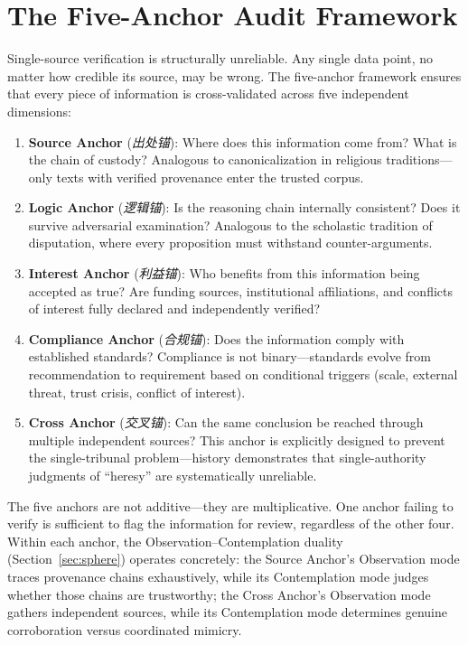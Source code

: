 \documentclass[11pt]{article}
\begin{document}
\section{The Five-Anchor Audit Framework}
\label{sec:five-anchor}

Single-source verification is structurally unreliable. Any single data point, no 
matter how credible its source, may be wrong. The five-anchor framework ensures 
that every piece of information is cross-validated across five independent dimensions:

\begin{enumerate}
  \item \textbf{Source Anchor} (\textit{出处锚}): Where does this information come from? 
    What is the chain of custody? Analogous to canonicalization in religious traditions---only 
    texts with verified provenance enter the trusted corpus.
  
  \item \textbf{Logic Anchor} (\textit{逻辑锚}): Is the reasoning chain internally consistent? 
    Does it survive adversarial examination? Analogous to the scholastic tradition of 
    disputation, where every proposition must withstand counter-arguments.
  
  \item \textbf{Interest Anchor} (\textit{利益锚}): Who benefits from this information being 
    accepted as true? Are funding sources, institutional affiliations, and conflicts of 
    interest fully declared and independently verified?
  
  \item \textbf{Compliance Anchor} (\textit{合规锚}): Does the information comply with 
    established standards? Compliance is not binary---standards evolve from recommendation 
    to requirement based on conditional triggers (scale, external threat, trust crisis, 
    conflict of interest).
  
  \item \textbf{Cross Anchor} (\textit{交叉锚}): Can the same conclusion be reached through 
    multiple independent sources? This anchor is explicitly designed to prevent the 
    single-tribunal problem---history demonstrates that single-authority judgments of 
    ``heresy'' are systematically unreliable.
\end{enumerate}

The five anchors are not additive---they are multiplicative. One anchor failing to 
verify is sufficient to flag the information for review, regardless of the other four.
Within each anchor, the Observation--Contemplation duality (Section~\ref{sec:sphere})
operates concretely: the Source Anchor's Observation mode traces provenance chains
exhaustively, while its Contemplation mode judges whether those chains are trustworthy;
the Cross Anchor's Observation mode gathers independent sources, while its
Contemplation mode determines genuine corroboration versus coordinated mimicry.
\end{document}
